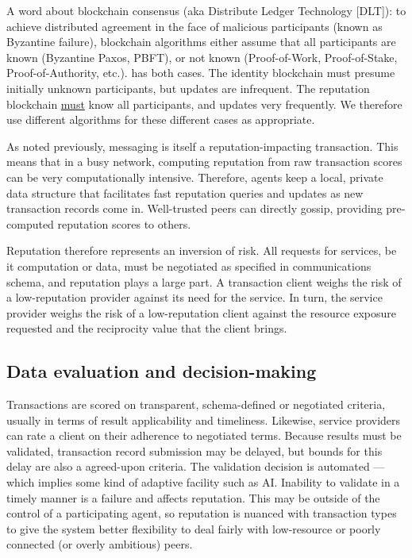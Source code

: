A word about blockchain consensus (aka Distribute Ledger Technology [DLT]): to achieve distributed agreement in the face of malicious participants (known as Byzantine failure), blockchain algorithms either assume that all participants are known (Byzantine Paxos, PBFT), or not known (Proof-of-Work, Proof-of-Stake, Proof-of-Authority, etc.).
\projectName has both cases.
The identity blockchain must presume initially unknown participants, but updates are infrequent.
The reputation blockchain \underline{must} know all participants, and updates very frequently.
We therefore use different algorithms for these different cases as appropriate.

As noted previously, messaging is itself a reputation-impacting transaction.
This means that in a busy network, computing reputation from raw transaction scores can be very computationally intensive.
Therefore, agents keep a local, private data structure that facilitates fast reputation queries and updates as new transaction records come in.
Well-trusted peers can directly gossip, providing pre-computed reputation scores to others.

Reputation therefore represents an inversion of risk.
All requests for services, be it computation or data, must be negotiated as specified in communications schema, and reputation plays a large part.
A transaction client weighs the risk of a low-reputation provider against its need for the service.
In turn, the service provider weighs the risk of a low-reputation client against the resource exposure requested and the reciprocity value that the client brings.

\begin{ppl}

\end{ppl}


\subsection{Data evaluation and decision-making}\label{subsec:eval}

Transactions are scored on transparent, schema-defined or negotiated criteria, usually in terms of result applicability and timeliness.
Likewise, service providers can rate a client on their adherence to negotiated terms.
Because results must be validated, transaction record submission may be delayed, but bounds for this delay are also a agreed-upon criteria.
The validation decision is automated --- which implies some kind of adaptive facility such as AI. Inability to validate in a timely manner is a failure and affects reputation.
This may be outside of the control of a participating agent, so reputation is nuanced with transaction types to give the system better flexibility to deal fairly with low-resource or poorly connected (or overly ambitious) peers.

